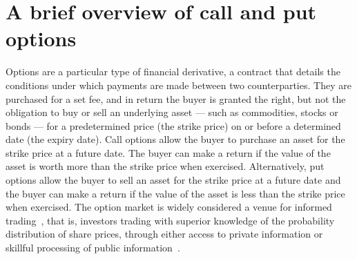 \section{A brief overview of call and put options}

Options are a particular type of financial derivative, a contract that details the conditions under which payments are made between two counterparties. They are purchased for a set fee, and in return the buyer is granted the right, but not the obligation to buy or sell an underlying asset --- such as commodities, stocks or bonds --- for a predetermined price (the strike price) on or before a determined date (the expiry date).
\nline{}
Call options allow the buyer to purchase an asset for the strike price at a future date. The buyer can make a return if the value of the asset is worth more than the strike price when exercised. Alternatively, put options allow the buyer to sell an asset for the strike price at a future date and the buyer can make a return if the value of the asset is less than the strike price when exercised.
\nline{}
The option market is widely considered a venue for informed trading~\cite{li2021effect,hu2014,chak2004}, that is, investors trading with superior knowledge of the probability distribution of share prices, through either access to private information or skillful processing of public information~\cite{grossman1975application}. 

